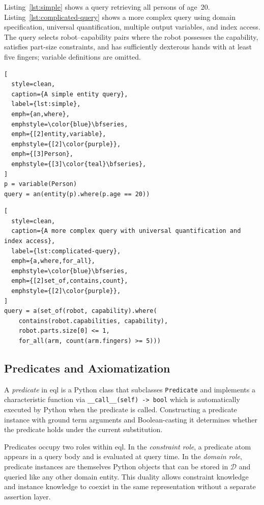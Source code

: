 \documentclass{article}
\begin{document}
Listing~\ref{lst:simple} shows a query retrieving all persons of age~20.
Listing~\ref{lst:complicated-query} shows a more complex query using domain
specification, universal quantification, multiple output variables, and index
access. The query selects robot--capability pairs where the robot possesses
the capability, satisfies part-size constraints, and has sufficiently dexterous
hands with at least five fingers; variable definitions are omitted.

\begin{lstlisting}[
  style=clean,
  caption={A simple entity query},
  label={lst:simple},
  emph={an,where},
  emphstyle=\color{blue}\bfseries,
  emph={[2]entity,variable},
  emphstyle={[2]\color{purple}},
  emph={[3]Person},
  emphstyle={[3]\color{teal}\bfseries},
]
p = variable(Person)
query = an(entity(p).where(p.age == 20))
\end{lstlisting}

\begin{lstlisting}[
  style=clean,
  caption={A more complex query with universal quantification and index access},
  label={lst:complicated-query},
  emph={a,where,for_all},
  emphstyle=\color{blue}\bfseries,
  emph={[2]set_of,contains,count},
  emphstyle={[2]\color{purple}},
]
query = a(set_of(robot, capability).where(
    contains(robot.capabilities, capability),
    robot.parts.size[0] <= 1,
    for_all(arm, count(arm.fingers) >= 5)))
\end{lstlisting}


\subsection{Predicates and Axiomatization}
\label{ssec:eql_predicates}

A \emph{predicate} in \ac{eql} is a Python class that subclasses
\texttt{Predicate} and implements a characteristic function via
\texttt{\_\_call\_\_(self) -> bool} which is automatically executed by Python when the predicate is called. Constructing a predicate instance with
ground term arguments and Boolean-casting it determines whether the predicate
holds under the current substitution.

Predicates occupy two roles within \ac{eql}. In the \emph{constraint role},
a predicate atom appears in a query body and is evaluated at query time. In
the \emph{domain role}, predicate instances are themselves Python objects that
can be stored in $\mathcal{D}$ and queried like any other domain entity. This
duality allows constraint knowledge and instance knowledge to coexist in the
same representation without a separate assertion layer.
\end{document}
